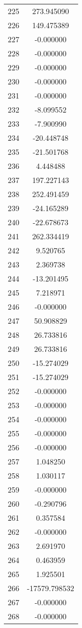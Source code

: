 \documentclass[12pt]{article}
\begin{document}
\begin{longtable}{@{}cc@{}}
225 & 273.945090 \\
226 & 149.475389 \\
227 & -0.000000 \\
228 & -0.000000 \\
229 & -0.000000 \\
230 & -0.000000 \\
231 & -0.000000 \\
232 & -8.099552 \\
233 & -7.900990 \\
234 & -20.448748 \\
235 & -21.501768 \\
236 & 4.448488 \\
237 & 197.227143 \\
238 & 252.491459 \\
239 & -24.165289 \\
240 & -22.678673 \\
241 & 262.334419 \\
242 & 9.520765 \\
243 & 2.369738 \\
244 & -13.201495 \\
245 & 7.218971 \\
246 & -0.000000 \\
247 & 50.908829 \\
248 & 26.733816 \\
249 & 26.733816 \\
250 & -15.274029 \\
251 & -15.274029 \\
252 & -0.000000 \\
253 & -0.000000 \\
254 & -0.000000 \\
255 & -0.000000 \\
256 & -0.000000 \\
257 & 1.048250 \\
258 & 1.030117 \\
259 & -0.000000 \\
260 & -0.290796 \\
261 & 0.357584 \\
262 & -0.000000 \\
263 & 2.691970 \\
264 & 0.463959 \\
265 & 1.925501 \\
266 & -17579.798532 \\
267 & -0.000000 \\
268 & -0.000000 \\

\end{longtable}
\end{document}
